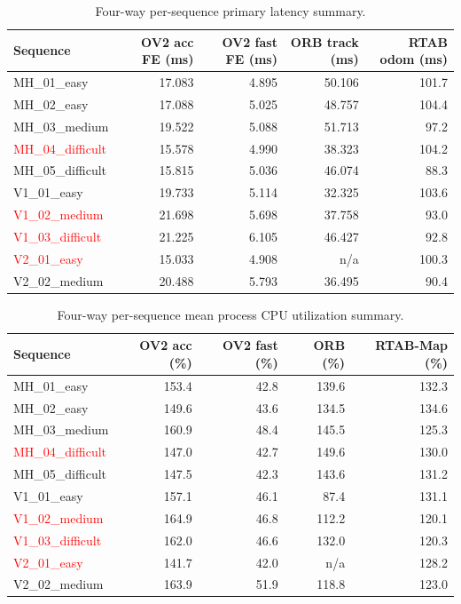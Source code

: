 \documentclass[11pt]{article}
\begin{document}
\begin{table}[H]
\centering
\small
\caption{Four-way per-sequence primary latency summary.}
\label{tab:three_way_summary_latency}
\begin{tabular}{lrrrr}
\toprule
Sequence & OV2 acc FE (ms) & OV2 fast FE (ms) & ORB track (ms) & RTAB odom (ms) \\
\midrule
MH\_01\_easy & 17.083 & 4.895 & 50.106 & 101.7 \\
MH\_02\_easy & 17.088 & 5.025 & 48.757 & 104.4 \\
MH\_03\_medium & 19.522 & 5.088 & 51.713 & 97.2 \\
\textcolor{red}{MH\_04\_difficult} & 15.578 & 4.990 & 38.323 & 104.2 \\
MH\_05\_difficult & 15.815 & 5.036 & 46.074 & 88.3 \\
V1\_01\_easy & 19.733 & 5.114 & 32.325 & 103.6 \\
\textcolor{red}{V1\_02\_medium} & 21.698 & 5.698 & 37.758 & 93.0 \\
\textcolor{red}{V1\_03\_difficult} & 21.225 & 6.105 & 46.427 & 92.8 \\
\textcolor{red}{V2\_01\_easy} & 15.033 & 4.908 & n/a & 100.3 \\
V2\_02\_medium & 20.488 & 5.793 & 36.495 & 90.4 \\
\bottomrule
\end{tabular}
\end{table}

\begin{table}[H]
\centering
\small
\caption{Four-way per-sequence mean process CPU utilization summary.}
\label{tab:three_way_summary_cpu}
\begin{tabular}{lrrrr}
\toprule
Sequence & OV2 acc (\%) & OV2 fast (\%) & ORB (\%) & RTAB-Map (\%) \\
\midrule
MH\_01\_easy & 153.4 & 42.8 & 139.6 & 132.3 \\
MH\_02\_easy & 149.6 & 43.6 & 134.5 & 134.6 \\
MH\_03\_medium & 160.9 & 48.4 & 145.5 & 125.3 \\
\textcolor{red}{MH\_04\_difficult} & 147.0 & 42.7 & 149.6 & 130.0 \\
MH\_05\_difficult & 147.5 & 42.3 & 143.6 & 131.2 \\
V1\_01\_easy & 157.1 & 46.1 & 87.4 & 131.1 \\
\textcolor{red}{V1\_02\_medium} & 164.9 & 46.8 & 112.2 & 120.1 \\
\textcolor{red}{V1\_03\_difficult} & 162.0 & 46.6 & 132.0 & 120.3 \\
\textcolor{red}{V2\_01\_easy} & 141.7 & 42.0 & n/a & 128.2 \\
V2\_02\_medium & 163.9 & 51.9 & 118.8 & 123.0 \\
\bottomrule
\end{tabular}
\end{table}
\end{document}
